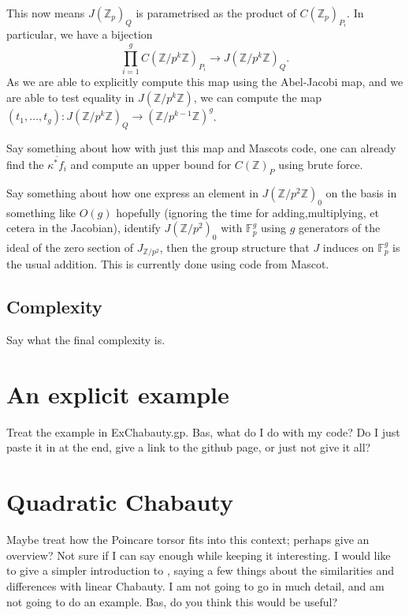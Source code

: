 \documentclass[12pt]{article}
\newcommand{\Z}{\mathbb{Z}}
\newcommand{\F}{\mathbb{F}}
\theoremstyle{plain}
\theoremstyle{definition}
\theoremstyle{remark}
\begin{document}
This now means $J(\Z_p)_Q$ is parametrised as the product of $C(\Z_p)_{P_i}$. In particular, we have a bijection
\[
\prod_{i=1}^g C(\Z/p^k\Z)_{P_i} \to J(\Z/p^k\Z)_{Q}.
\] As we are able to explicitly compute this map using the Abel-Jacobi map, and we are able to test equality in $J(\Z/p^k\Z)$, we can compute the map $(t_1,\dots,t_g): J(\Z/p^k\Z)_Q \to (\Z/p^{k-1}\Z)^g$.


Say something about how with just this map and Mascots code, one can already find the $\overline{\kappa^* f_i} $ and compute an upper bound for $C(\Z)_P$ using brute force.

Say something about how one express an element in $J(\Z/p^2\Z)_0$ on the basis in something like $O(g)$ hopefully (ignoring the time for adding,multiplying, et cetera in the Jacobian), identify $J(\Z/p^2)_0$ with $\F_p^g$ using $g$ generators of the ideal of the zero section of $J_{\Z/p^2}$, then the group structure that $J$ induces on $\F_p^g$ is the usual addition. This is currently done using code from Mascot.

\subsection{Complexity}
Say what the final complexity is.

\section{An explicit example}
\label{section:example}
Treat the example in ExChabauty.gp. Bas, what do I do with my code? Do I just paste it in at the end, give a link to the github page, or just not give it all?

\section{Quadratic Chabauty}
Maybe treat how the Poincare torsor fits into this context; perhaps give an overview? Not sure if I can say enough while keeping it interesting. I would like to give a simpler introduction to \citep{edixhoven20}, saying a few things about the similarities and differences with linear Chabauty. I am not going to go in much detail, and am not going to do an example. Bas, do you think this would be useful?

\newpage


\end{document}
